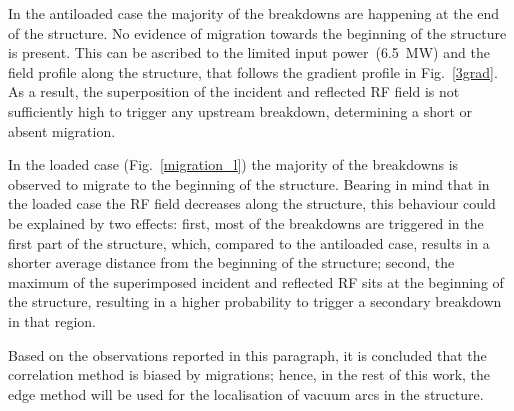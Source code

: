 In the antiloaded case the majority of the breakdowns are happening at the end of the structure. No evidence of migration towards the beginning of the structure is present. This can be ascribed to the limited input power~(6.5~MW) and the field profile along the structure, that follows the gradient profile in Fig.~\ref{3grad}. As a result, the superposition of the incident and reflected RF field is not sufficiently high to trigger any upstream breakdown, determining a short or absent migration.

In the loaded case (Fig.~\ref{migration_l}) the majority of the breakdowns is observed to migrate to the beginning of the structure. Bearing in mind that in the loaded case the RF field decreases along the structure, this behaviour could be explained by two effects: first, most of the breakdowns are triggered in the first part of the structure, which, compared to the antiloaded case, results in a shorter  average distance from the beginning of the structure; second, the maximum of the superimposed incident and reflected RF sits at the beginning of the structure, resulting in a higher  probability to trigger a secondary breakdown in that region.



Based on the observations reported in this paragraph, it is concluded that the correlation method is biased by migrations; hence, in the rest of this work, the edge method will be used for the localisation of vacuum arcs in the structure.

